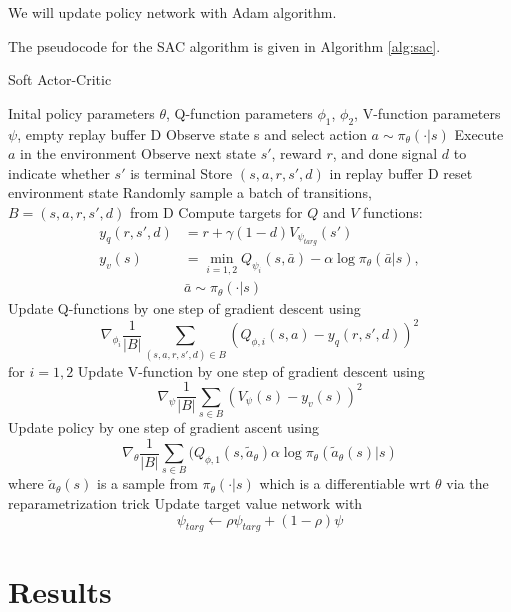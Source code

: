 \documentclass{article}
\begin{document}
We will update policy network with Adam algorithm.

The pseudocode for the SAC algorithm is given in Algorithm \ref{alg:sac}.

\begin{algorithm}[h]
	\caption{Soft Actor-Critic}
	\label{alg:sac}
	\begin{algorithmic}
		\STATE Inital policy parameters $\theta$, Q-function parameters $\phi_1$, $\phi_2$, V-function parameters $\psi$, empty replay buffer $\mathrm{D}$
		\REPEAT
			\STATE Observe state s and select action $a\sim\pi_\theta(\cdot|s)$
			\STATE Execute $a$ in the environment
			\STATE Observe next state $s'$, reward $r$, and done signal $d$ to indicate whether $s'$ is terminal
			\STATE Store $(s,a,r,s',d)$ in replay buffer $\mathrm{D}$
			\STATE  reset environment state 
			\ENDIF
					\STATE Randomly sample a batch of transitions, \\
					$B=(s,a,r,s',d)$ from $\mathrm{D}$
					\STATE Compute targets for $Q$ and $V$ functions:
					\STATE 
					\begin{align*} 
					y_q (r,s',d) &=  r+\gamma(1-d)V_{\psi_{targ}}(s') \\ 
					y_v(s) &= \min_{i=1,2} Q_{\psi_i}(s,\bar{a}) - \alpha\log\pi_\theta(\bar{a}|s), \\
					& \bar{a}\sim\pi_\theta(\cdot|s)
					\end{align*}
					\STATE Update Q-functions by one step of gradient descent using
					$$\nabla_{\phi_i} \frac{1}{|B|} \sum_{(s,a,r,s',d)\in B} {(Q_{\phi,i}(s,a) - y_q(r,s',d))}^2$$
					$\mathrm{for}$  $i=1,2$
					\STATE Update V-function by one step of gradient descent using
					$$\nabla_{\psi} \frac{1}{|B|} \sum_{s\in B} {(V_{\psi}(s) - y_v(s))}^2$$
					\STATE Update policy by one step of gradient ascent using
					$$\nabla_{\theta} \frac{1}{|B|} \sum_{s\in B} {(Q_{\phi,1}(s,\tilde{a}_\theta)\alpha\log\pi_\theta(\tilde{a}_\theta(s)|s)}$$
					where $\tilde{a}_\theta(s)$ is a sample from $\pi_\theta(\cdot|s)$ which is a differentiable wrt $\theta$ via the reparametrization trick
					\STATE Update target value network with
					$$\psi_{targ}\leftarrow\rho\psi_{targ}+(1-\rho)\psi$$
				\ENDFOR
			\ENDIF
	\end{algorithmic}
\end{algorithm}

\section{Results}
\end{document}
